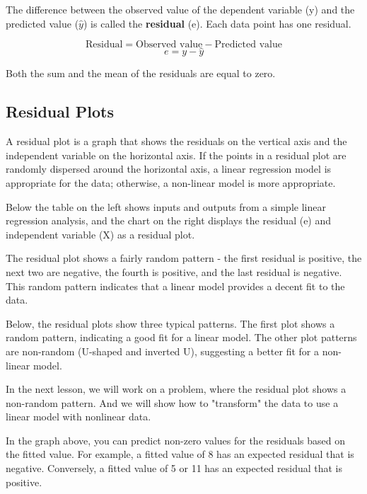 \documentclass[12pt, a4paper]{article}
\theoremstyle{plain}
\theoremstyle{definition}
\theoremstyle{remark}
\begin{document}
The difference between the observed value of the dependent variable (y) and the predicted value ($\hat{y}$) is called the \textbf{residual} (e). Each data point has one residual.

\[\mbox{Residual} = \mbox{Observed value} - \mbox{Predicted value}\] 
\[e = y - \hat{y}\]

Both the sum and the mean of the residuals are equal to zero. 

\subsection{Residual Plots}
A residual plot is a graph that shows the residuals on the vertical axis and the independent variable on the horizontal axis. If the points in a residual plot are randomly dispersed around the horizontal axis, a linear regression model is appropriate for the data; otherwise, a non-linear model is more appropriate.

Below the table on the left shows inputs and outputs from a simple linear regression analysis, and the chart on the right displays the residual (e) and independent variable (X) as a residual plot.

\newpage
The residual plot shows a fairly random pattern - the first residual is positive, the next two are negative, the fourth is positive, and the last residual is negative. This random pattern indicates that a linear model provides a decent fit to the data.

Below, the residual plots show three typical patterns. The first plot shows a random pattern, indicating a good fit for a linear model. The other plot patterns are non-random (U-shaped and inverted U), suggesting a better fit for a non-linear model.

		
In the next lesson, we will work on a problem, where the residual plot shows a non-random pattern. And we will show how to "transform" the data to use a linear model with nonlinear data.

\newpage
In the graph above, you can predict non-zero values for the residuals based on the fitted value. For example, a fitted value of 8 has an expected residual that is negative. Conversely, a fitted value of 5 or 11 has an expected residual that is positive.
\end{document}
